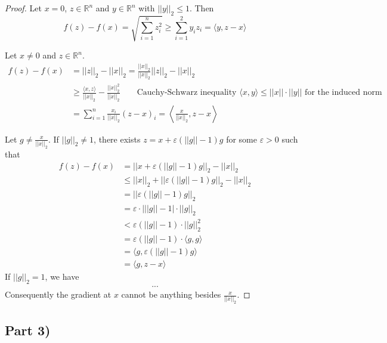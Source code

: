 \documentclass[10pt,a4paper]{article}
\begin{document}
\begin{proof}
  Let $x = 0$, $z \in \mathbb{R}^{n}$ and $y \in \mathbb{R}^{n}$ with $||y||_{2} \le 1$.
  Then
  \begin{equation*}
    f(z) - f(x) = \sqrt{\sum_{i = 1}^{n} z_{i}^{2}} \ge \sum_{i = 1}^{2} y_{i}z_{i} = \langle y, z - x \rangle
  \end{equation*}

  Let $x \ne 0$ and $z \in \mathbb{R}^{n}$.
  \begin{align*}
    f(z) - f(x) & = ||z||_{2} - ||x||_{2} = \frac{||x||_{2}}{||x||_{2}}||z||_{2} - ||x||_{2}\\
                & \ge \frac{\langle x, z \rangle}{||x||_{2}} - \frac{||x||_{2}^{2}}{||x||_{2}} \qquad \text{Cauchy-Schwarz inequality $\langle x, y \rangle \le ||x|| \cdot ||y||$ for the induced norm}\\
                & = \sum_{i = 1}^{n} \frac{x_{i}}{||x||_{2}}(z - x)_{i} = \left\langle \frac{x}{||x||_{2}}, z - x \right\rangle
  \end{align*}

  Let $g \ne \frac{x}{||x||_{2}}$.
  If $||g||_{2} \ne 1$, there exists $z = x + \varepsilon(||g|| - 1)g$ for some $\varepsilon > 0$ such that
  \begin{align*}
    f(z) - f(x) & = ||x + \varepsilon(||g|| - 1)g||_{2} - ||x||_{2}\\
                & \le ||x||_{2} + ||\varepsilon(||g|| - 1)g||_{2} - ||x||_{2}\\
                & = ||\varepsilon(||g|| - 1)g||_{2}\\
                & = \varepsilon \cdot \left|||g|| - 1\right| \cdot ||g||_{2}\\
                & < \varepsilon(||g|| - 1) \cdot ||g||_{2}^{2}\\
                & = \varepsilon(||g|| - 1) \cdot \langle g, g \rangle\\
                & = \langle g, \varepsilon(||g|| - 1)g \rangle\\
                & = \langle g, z - x \rangle
  \end{align*}
  If $||g||_{2} = 1$, we have
  \begin{align*}
    ...
  \end{align*}
  Consequently the gradient at $x$ cannot be anything besides $\frac{x}{||x||_{2}}$.
\end{proof}

\subsection*{Part 3)}
\end{document}
